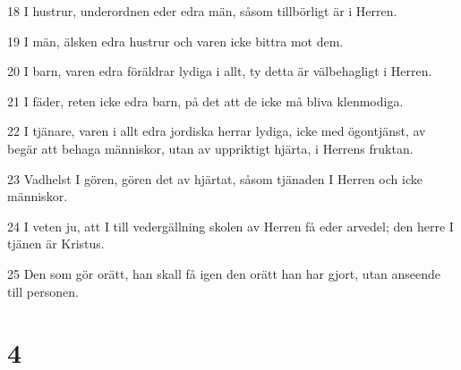 \par 18 I hustrur, underordnen eder edra män, såsom tillbörligt är i Herren.
\par 19 I män, älsken edra hustrur och varen icke bittra mot dem.
\par 20 I barn, varen edra föräldrar lydiga i allt, ty detta är välbehagligt i Herren.
\par 21 I fäder, reten icke edra barn, på det att de icke må bliva klenmodiga.
\par 22 I tjänare, varen i allt edra jordiska herrar lydiga, icke med ögontjänst, av begär att behaga människor, utan av uppriktigt hjärta, i Herrens fruktan.
\par 23 Vadhelst I gören, gören det av hjärtat, såsom tjänaden I Herren och icke människor.
\par 24 I veten ju, att I till vedergällning skolen av Herren få eder arvedel; den herre I tjänen är Kristus.
\par 25 Den som gör orätt, han skall få igen den orätt han har gjort, utan anseende till personen.

\chapter{4}

